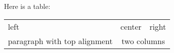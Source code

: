 \documentclass{article}
\begin{document}
Here is a table:

\begin{tabular}{|l|c|r|}
\hline
left & center & right \\
\cline{2-3}
paragraph with top alignment & \multicolumn{2}{|c|}{two columns} \\
\hline
\end{tabular}
\end{document}
